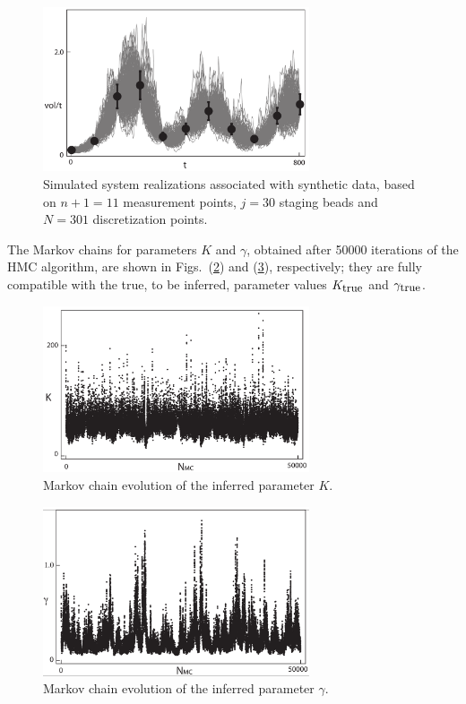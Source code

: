 \documentclass[11pt]{article}
\theoremstyle{definition}
\begin{document}
%
\begin{figure}[htb!]
    \centering
    \includegraphics[width=0.7\textwidth]{Fig3.pdf}
    \caption{Simulated system realizations associated with synthetic data, based on $n+1 = 11$ measurement points, $j=30$ staging beads and  $N=301$ discretization points.
}
    \label{fig:spaghetti}
\end{figure}
The Markov chains for parameters $K$ and $\gamma$, obtained after 50000 iterations of the HMC algorithm, are shown in Figs.~(\ref{fig:chainK}) and (\ref{fig:chainG}), respectively; they are fully compatible with the true, to be inferred, parameter values $K_{\mbox{\small true}}$ and $\gamma_{\mbox{\small true}}$.



\begin{figure}[htb!]
    \centering
    \includegraphics[width=0.7\textwidth]{Fig4.pdf}
    \caption{Markov chain evolution of the inferred parameter $K$.}
    \label{fig:chainK}
\end{figure}
%
\begin{figure}[htb!]
    \centering
    \includegraphics[width=0.7\textwidth]{Fig5.pdf}
    \caption{Markov chain evolution of the inferred parameter $\gamma$.}
    \label{fig:chainG}
\end{figure}
\end{document}
